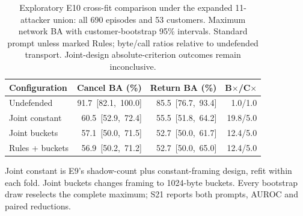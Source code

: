 \begin{table}[t]\centering\footnotesize\setlength{\tabcolsep}{2pt}
\caption{Exploratory E10 cross-fit comparison under the expanded 11-attacker union: all 690 episodes and 53 customers. Maximum network BA with customer-bootstrap 95\% intervals. Standard prompt unless marked Rules; byte/call ratios relative to undefended transport. Joint-design absolute-criterion outcomes remain inconclusive.}\label{tab:r5}
\begin{tabular}{@{}lrrr@{}}\toprule
Configuration & Cancel BA (\%) & Return BA (\%) & B$\times$/C$\times$\\\midrule
Undefended & \mbox{91.7 [82.1, 100.0]} & \mbox{85.5 [76.7, 93.4]} & 1.0/1.0\\
Joint constant & \mbox{60.5 [52.9, 72.4]} & \mbox{55.5 [51.8, 64.2]} & 19.8/5.0\\
Joint buckets & \mbox{57.1 [50.0, 71.5]} & \mbox{52.7 [50.0, 61.7]} & 12.4/5.0\\
Rules + buckets & \mbox{56.9 [50.2, 71.2]} & \mbox{52.7 [50.0, 65.0]} & 12.4/5.0\\
\bottomrule\end{tabular}
\par\smallskip\raggedright Joint constant is E9's shadow-count plus constant-framing design, refit within each fold. Joint buckets changes framing to 1024-byte buckets. Every bootstrap draw reselects the complete maximum; S21 reports both prompts, AUROC and paired reductions.
\end{table}
